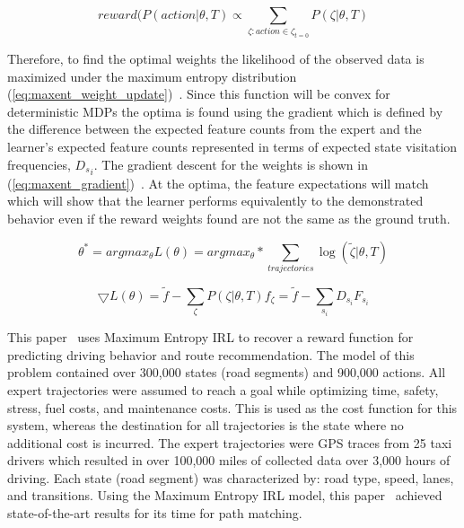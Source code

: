 \documentclass[12pt,american]{report}
\begin{document}
\begin{equation}
            \label{eq:stochastic_policy}
            reward(P(action | \theta, T) \propto \sum_{\zeta:action\in\zeta_{t=0}}^{}P(\zeta | \theta, T)%
        \end{equation}

Therefore, to find the optimal weights the likelihood of the observed data is maximized under the maximum entropy distribution (\ref{eq:maxent_weight_update})~\cite{ziebart2008maximum}. Since this function will be convex for deterministic MDPs the optima is found using the gradient  which is defined by the difference between the expected feature counts from the expert and the learner's expected feature counts represented in terms of expected state visitation frequencies, ${{}D_s}_{i}$.  The gradient descent for the weights is shown in (\ref{eq:maxent_gradient})~\cite{ziebart2008maximum}. At the optima, the feature expectations will match which will show that the learner performs equivalently to the demonstrated behavior even if the reward weights found are not the same as the ground truth.

\begin{equation}
            \label{eq:maxent_weight_update}
            \theta^* = argmax_\theta L(\theta) = argmax_\theta * \sum_{trajectories}^{}\log(\tilde\zeta|\theta,T)%
        \end{equation}

\begin{equation}
            \label{eq:maxent_gradient}
            \bigtriangledown L(\theta) = \tilde f - \sum_{\zeta}^{} P(\zeta|\theta,T)f_\zeta = \tilde f - \sum_{s_i}^{}D_{s_{i}}F_{s_{i}}%
        \end{equation}

This paper~\cite{ziebart2008maximum} uses Maximum Entropy IRL to recover a reward function for predicting driving behavior and route recommendation. The model of this problem contained over 300,000 states (road segments) and 900,000 actions. All expert trajectories were assumed to reach a goal while optimizing time, safety, stress, fuel costs, and maintenance costs. This is used as the cost function for this system, whereas the destination for all trajectories is the state where no additional cost is incurred. The expert trajectories were GPS traces from 25 taxi drivers which resulted in over 100,000 miles of collected data over 3,000 hours of driving. Each state (road segment) was characterized by: road type, speed, lanes, and transitions. Using the Maximum Entropy IRL model, this paper~\cite{ziebart2008maximum} achieved state-of-the-art results for its time for path matching.
\end{document}
